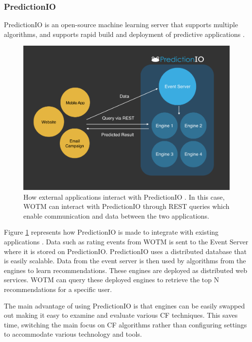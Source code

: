 \subsubsection{PredictionIO}

PredictionIO is an open-source machine learning server that supports multiple algorithms, and supports rapid build and deployment of predictive applications \cite{predictionio, predictionio2}.

\begin{figure}
\centering
\includegraphics[scale=0.35]{images/predictionIO}
\caption{ How external applications interact with PredictionIO \cite{predictionio}. In this case, WOTM can interact with PredictionIO through REST queries which enable communication and data between the two applications.}
\label{fig:predictionIO}
\end{figure}

Figure \ref{fig:predictionIO} represents how PredictionIO is made to integrate with existing applications \cite{predictionio}. Data such as rating events from WOTM is sent to the Event Server where it is stored on PredictionIO. PredictionIO uses a distributed database that is easily scalable. Data from the event server is then used by algorithms from the engines to learn recommendations. These engines are deployed as distributed web services. WOTM can query these deployed engines to retrieve the top N recommendations for a specific user. 

The main advantage of using PredictionIO is that engines can be easily swapped out making it easy to examine and evaluate various CF techniques. This saves time, switching the main focus on CF algorithms rather than configuring settings to accommodate various technology and tools.

